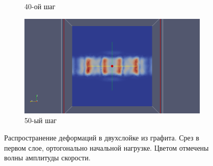 \begin{figure}[H]
\begin{subfigure}[b]{0.5\textwidth}
\caption{40-ой шаг}
\end{subfigure}
\begin{subfigure}[b]{0.5\textwidth}
\centering
\includegraphics[width=1.0\textwidth]{png/two-graphite-layers/slice_50.png}
\caption{50-ый шаг}
\end{subfigure}
\caption{Распространение деформаций в двухслойке из графита. Срез в первом слое, ортогонально начальной нагрузке. Цветом отмечены волны амплитуды скорости.}
\label{pic:two_graphite_slice1}
\end{figure}

